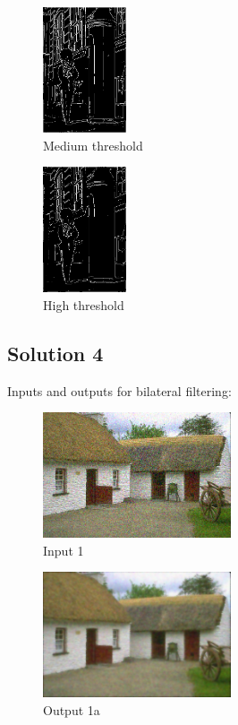 \documentclass{article}
\newcommand{\solution}[1]{\clearpage \subsection*{Solution #1}}
\begin{document}
\begin{figure}[!h]
  \centering
  \includegraphics[height=10em]{code/outputs/prob3_b_nms1.png}
  \caption{Medium threshold}
\end{figure}

\begin{figure}[!h]
  \centering
  \includegraphics[height=10em]{code/outputs/prob3_b_nms2.png}
  \caption{High threshold}
\end{figure}

\solution{4}

Inputs and outputs for bilateral filtering:

\begin{figure}[!h]
  \centering
  \includegraphics[height=10em]{code/inputs/p4_nz1.png}
  \caption{Input 1}
\end{figure}

\begin{figure}[!h]
  \centering
  \includegraphics[height=10em]{code/outputs/prob4_1_a.png}
  \caption{Output 1a}
\end{figure}
\end{document}
